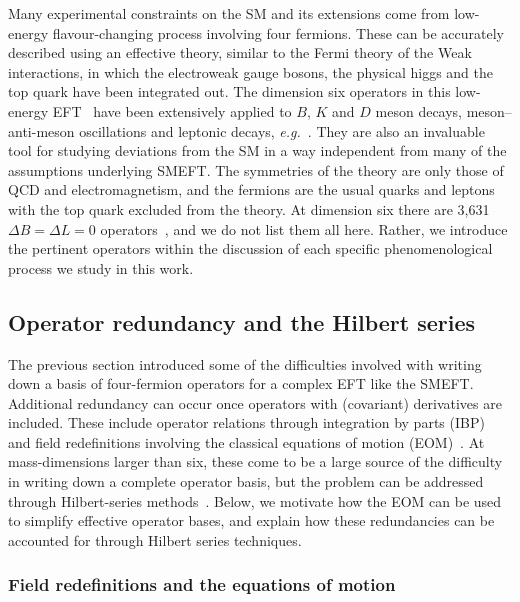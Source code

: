 Many experimental constraints on the SM and its extensions come from low-energy
flavour-changing process involving four fermions. These can be accurately
described using an effective theory, similar to the Fermi theory of the Weak
interactions, in which the electroweak gauge bosons, the physical higgs and the
top quark have been integrated out. The dimension six operators in this
low-energy EFT~\cite{Jenkins:2017jig, Aebischer:2017gaw, Jenkins:2017dyc,
  Aebischer:2015fzz} have been extensively applied to $B$, $K$ and $D$ meson
decays, meson--anti-meson oscillations and leptonic decays,
\textit{e.g.}~\cite{Buchalla:1995vs}. They are also an invaluable tool for
studying deviations from the SM in a way independent from many of the
assumptions underlying SMEFT. The symmetries of the theory are only those of QCD
and electromagnetism, and the fermions are the usual quarks and leptons with the
top quark excluded from the theory. At dimension six there are 3,631
$\Delta B = \Delta L = 0$ operators~\cite{Jenkins:2017jig}, and we do not list
them all here. Rather, we introduce the pertinent operators within the
discussion of each specific phenomenological process we study in this work.

\subsection{Operator redundancy and the Hilbert series}

The previous section introduced some of the difficulties involved with writing
down a basis of four-fermion operators for a complex EFT like the SMEFT.
Additional redundancy can occur once operators with (covariant) derivatives are
included. These include operator relations through integration by parts (IBP)
and field redefinitions involving the classical equations of motion
(EOM)~\cite{Buchmuller:1985jz, Arzt:1993gz, Georgi:1991ch}. At mass-dimensions
larger than six, these come to be a large source of the difficulty in writing
down a complete operator basis, but the problem can be addressed through
Hilbert-series methods~\cite{Lehman:2015via, Henning:2015daa, Lehman:2015coa,
  Henning:2015alf, Henning:2017fpj}. Below, we motivate how the EOM can be used
to simplify effective operator bases, and explain how these redundancies can be
accounted for through Hilbert series techniques.

\subsubsection{Field redefinitions and the equations of motion}
\label{sec:ch1-eom}

